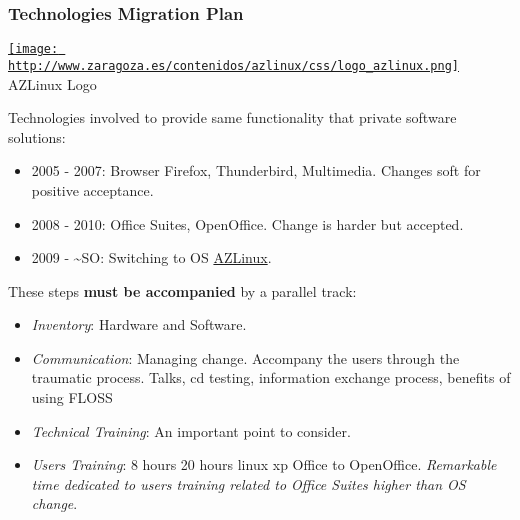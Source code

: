\subsubsection{ Technologies Migration Plan}
\begin{tabular}\href{http://www.zaragoza.es/contenidos/azlinux/css/logo_azlinux.png}{
\texttt{[image: http://www.zaragoza.es/contenidos/azlinux/css/logo\_azlinux.png]}} \\ 
AZLinux Logo
\end{tabular} Technologies involved to provide same functionality that private software solutions:
\begin{itemize}
	\item 2005 - 2007: Browser Firefox, Thunderbird, Multimedia. Changes soft for positive acceptance.
	\item 2008 - 2010: Office Suites, OpenOffice. Change is harder but accepted.
	\item 2009 - \textasciitilde SO: Switching to OS \href{http://zaragozaciudad.net/azlinux/}{AZLinux}.
\end{itemize} These steps \textbf{must be accompanied} by a parallel track:
\begin{itemize}
	\item \textit{Inventory}: Hardware and Software.
	\item \textit{Communication}: Managing change. Accompany the users through the traumatic process. Talks, cd testing, information exchange process, benefits of using FLOSS
	\item \textit{Technical Training}: An important point to consider.
	\item \textit{Users Training}: 8 hours 20 hours linux xp Office to OpenOffice. \textit{Remarkable time dedicated to users training related to Office Suites higher than OS change}.
\end{itemize}

